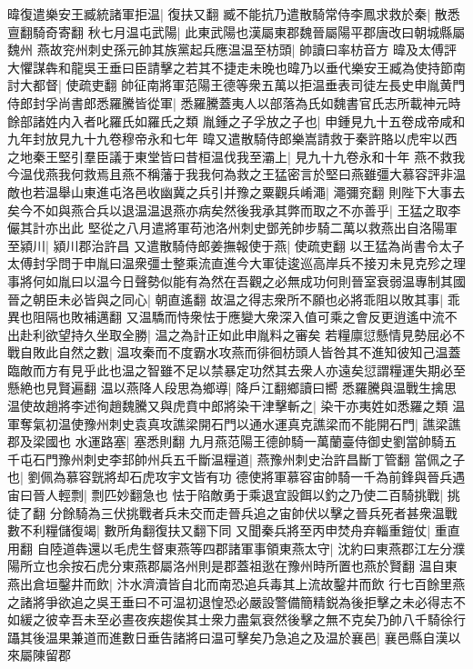 暐復遣樂安王臧統諸軍拒温|{
	復扶又翻}
臧不能抗乃遣散騎常侍李鳳求救於秦|{
	散悉亶翻騎奇寄翻}
秋七月温屯武陽|{
	此東武陽也漢屬東郡魏晉屬陽平郡唐改曰朝城縣屬魏州}
燕故兖州刺史孫元帥其族黨起兵應温温至枋頭|{
	帥讀曰率枋音方}
暐及太傅評大懼謀犇和龍吳王垂曰臣請擊之若其不捷走未晚也暐乃以垂代樂安王臧為使持節南討大都督|{
	使疏吏翻}
帥征南將軍范陽王德等衆五萬以拒温垂表司徒左長史申胤黄門侍郎封孚尚書郎悉羅騰皆從軍|{
	悉羅騰蓋夷人以部落為氏如魏書官氏志所載神元時餘部諸姓内入者叱羅氏如羅氏之類}
胤鍾之子孚放之子也|{
	申鍾見九十五卷成帝咸和九年封放見九十九卷穆帝永和七年}
暐又遣散騎侍郎樂嵩請救于秦許賂以虎牢以西之地秦王堅引羣臣議于東堂皆曰昔桓温伐我至灞上|{
	見九十九卷永和十年}
燕不救我今温伐燕我何救焉且燕不稱藩于我我何為救之王猛密言於堅曰燕雖彊大慕容評非温敵也若温舉山東進屯洛邑收幽冀之兵引并豫之粟觀兵崤澠|{
	澠彌兖翻}
則陛下大事去矣今不如與燕合兵以退温温退燕亦病矣然後我承其弊而取之不亦善乎|{
	王猛之取李儼其計亦出此}
堅從之八月遣將軍苟池洛州刺史鄧羌帥步騎二萬以救燕出自洛陽軍至潁川|{
	潁川郡治許昌}
又遣散騎侍郎姜撫報使于燕|{
	使疏吏翻}
以王猛為尚書令太子太傅封孚問于申胤曰温衆彊士整乘流直進今大軍徒逡巡高岸兵不接刃未見克殄之理事將何如胤曰以温今日聲勢似能有為然在吾觀之必無成功何則晉室衰弱温專制其國晉之朝臣未必皆與之同心|{
	朝直遙翻}
故温之得志衆所不願也必將乖阻以敗其事|{
	乖異也阻隔也敗補邁翻}
又温驕而恃衆怯于應變大衆深入值可乘之會反更逍遙中流不出赴利欲望持久坐取全勝|{
	温之為計正如此申胤料之審矣}
若糧廪愆懸情見勢屈必不戰自敗此自然之數|{
	温攻秦而不度霸水攻燕而徘徊枋頭人皆咎其不進知彼知己温蓋臨敵而方有見乎此也温之智雖不足以禁暴定功然其去衆人亦遠矣愆謂糧運失期必至懸絶也見賢遍翻}
温以燕降人段思為鄉導|{
	降戶江翻鄉讀曰嚮}
悉羅騰與温戰生擒思温使故趙將李述徇趙魏騰又與虎賁中郎將染干津擊斬之|{
	染干亦夷姓如悉羅之類}
温軍奪氣初温使豫州刺史袁真攻譙梁開石門以通水運真克譙梁而不能開石門|{
	譙梁譙郡及梁國也}
水運路塞|{
	塞悉則翻}
九月燕范陽王德帥騎一萬蘭臺侍御史劉當帥騎五千屯石門豫州刺史李邽帥州兵五千斷温糧道|{
	燕豫州刺史治許昌斷丁管翻}
當佩之子也|{
	劉佩為慕容皝將却石虎攻宇文皆有功}
德使將軍慕容宙帥騎一千為前鋒與晉兵遇宙曰晉人輕剽|{
	剽匹妙翻急也}
怯于陷敵勇于乘退宜設餌以釣之乃使二百騎挑戰|{
	挑徒了翻}
分餘騎為三伏挑戰者兵未交而走晉兵追之宙帥伏以擊之晉兵死者甚衆温戰數不利糧儲復竭|{
	數所角翻復扶又翻下同}
又聞秦兵將至丙申焚舟弃輜重鎧仗|{
	重直用翻}
自陸道犇還以毛虎生督東燕等四郡諸軍事領東燕太守|{
	沈約曰東燕郡江左分濮陽所立也余按石虎分東燕郡屬洛州則是郡蓋祖逖在豫州時所置也燕於賢翻}
温自東燕出倉垣鑿井而飲|{
	汴水濟瀆皆自北而南恐追兵毒其上流故鑿井而飲}
行七百餘里燕之諸將爭欲追之吳王垂曰不可温初退惶恐必嚴設警備簡精鋭為後拒擊之未必得志不如緩之彼幸吾未至必晝夜疾趨俟其士衆力盡氣衰然後擊之無不克矣乃帥八千騎徐行躡其後温果兼道而進數日垂告諸將曰温可擊矣乃急追之及温於襄邑|{
	襄邑縣自漢以來屬陳留郡}
